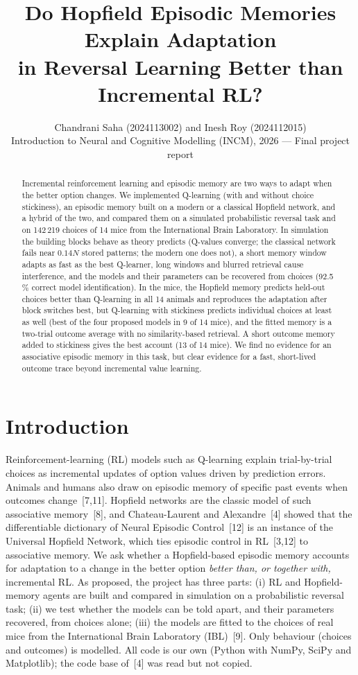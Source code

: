 \documentclass[10pt,a4paper]{article}
\title{\vspace{-1.2cm}\Large\bfseries Do Hopfield Episodic Memories Explain Adaptation\\ in Reversal Learning Better than Incremental RL?\vspace{-0.2cm}}
\author{Chandrani Saha (2024113002) \quad and \quad Inesh Roy (2024112015)\\[1pt]
\small Introduction to Neural and Cognitive Modelling (INCM), 2026 --- Final project report}
\date{\vspace{-0.9cm}}
\begin{document}
\maketitle

\begin{abstract}\noindent
Incremental reinforcement learning and episodic memory are two ways to adapt when the better option changes.
We implemented Q-learning (with and without choice stickiness), an episodic memory built on a modern or a
classical Hopfield network, and a hybrid of the two, and compared them on a simulated probabilistic reversal task
and on 142\,219 choices of 14 mice from the International Brain Laboratory. In simulation the building blocks
behave as theory predicts (Q-values converge; the classical network fails near $0.14N$ stored patterns; the
modern one does not), a short memory window adapts as fast as the best Q-learner, long windows and blurred
retrieval cause interference, and the models and their parameters can be recovered from choices (92.5\,\%
correct model identification). In the mice, the Hopfield memory predicts held-out choices better than
Q-learning in all 14 animals and reproduces the adaptation after block switches best, but Q-learning with
stickiness predicts individual choices at least as well (best of the four proposed models in 9 of 14 mice), and
the fitted memory is a two-trial outcome average with no similarity-based retrieval. A short outcome memory
added to stickiness gives the best account (13 of 14 mice). We find no evidence for an associative episodic
memory in this task, but clear evidence for a fast, short-lived outcome trace beyond incremental value learning.
\end{abstract}
\vspace{-0.3cm}

\section{Introduction}
Reinforcement-learning (RL) models such as Q-learning explain trial-by-trial choices as incremental updates of
option values driven by prediction errors. Animals and humans also draw on episodic memory of specific past
events when outcomes change~[7,11]. Hopfield networks are the classic model of such associative memory~[8], and
Chateau-Laurent and Alexandre~[4] showed that the differentiable dictionary of Neural Episodic Control~[12] is an
instance of the Universal Hopfield Network, which ties episodic control in RL~[3,12] to associative memory.
We ask whether a Hopfield-based episodic memory accounts for adaptation to a change in the better option
\emph{better than, or together with,} incremental RL. As proposed, the project has three parts:
(i) RL and Hopfield-memory agents are built and compared in simulation on a probabilistic reversal task;
(ii) we test whether the models can be told apart, and their parameters recovered, from choices alone;
(iii) the models are fitted to the choices of real mice from the International Brain Laboratory (IBL)~[9].
Only behaviour (choices and outcomes) is modelled. All code is our own
(Python with NumPy, SciPy and Matplotlib); the code base of~[4] was read but not copied.
\end{document}
